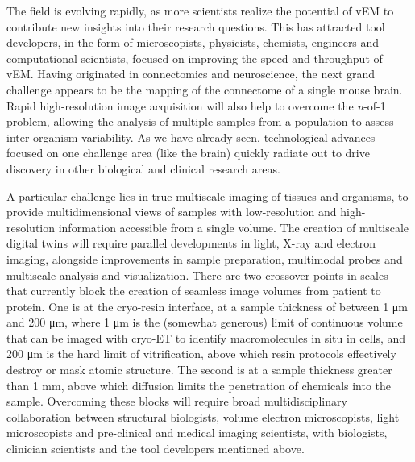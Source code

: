 \documentclass{article}
\begin{document}
The field is evolving rapidly, as more scientists realize the potential of vEM to contribute new insights into their research questions. This has attracted tool developers, in the form of microscopists, physicists, chemists, engineers and computational scientists, focused on improving the speed and throughput of vEM. Having originated in connectomics and neuroscience, the next grand challenge appears to be the mapping of the connectome of a single mouse brain. Rapid high-resolution image acquisition will also help to overcome the \emph{n}-of-1 problem, allowing the analysis of multiple samples from a population to assess inter-organism variability. As we have already seen, technological advances focused on one challenge area (like the brain) quickly radiate out to drive discovery in other biological and clinical research areas.

A particular challenge lies in true multiscale imaging of tissues and organisms, to provide multidimensional views of samples with low-resolution and high-resolution information accessible from a single volume. The creation of multiscale digital twins will require parallel developments in light, X-ray and electron imaging, alongside improvements in sample preparation, multimodal probes and multiscale analysis and visualization. There are two crossover points in scales that currently block the creation of seamless image volumes from patient to protein. One is at the cryo-resin interface, at a sample thickness of between 1 μm and 200 μm, where 1 μm is the (somewhat generous) limit of continuous volume that can be imaged with cryo-ET to identify macromolecules in situ in cells, and 200 μm is the hard limit of vitrification, above which resin protocols effectively destroy or mask atomic structure. The second is at a sample thickness greater than 1 mm, above which diffusion limits the penetration of chemicals into the sample. Overcoming these blocks will require broad multidisciplinary collaboration between structural biologists, volume electron microscopists, light microscopists and pre-clinical and medical imaging scientists, with biologists, clinician scientists and the tool developers mentioned above.
\end{document}
